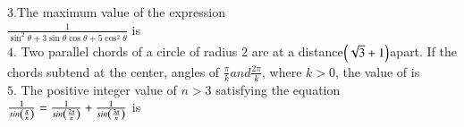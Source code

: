 \documentclass[journal,12pt,twocolumn]{IEEEtran}
\theoremstyle{remark}
\begin{document}
$3$.The maximum value of the expression
\\$\frac{1}{\sin^2\theta+3\sin\theta \cos\theta+5\cos^2\theta}$ is  \hfill{}
\\


$4$. Two parallel chords of a circle of radius $2$ are at a distance$\left(\sqrt{3}+1\right) $\space apart. If the chords subtend at the center, angles of $\frac{\pi}{k} and \frac{2\pi}{k}$, where $k>0$, the value of  is \hfill{}
\\

$5$. The positive integer value of $n>3$ satisfying the equation $\frac{1}{sin\left(\frac{\pi}{n}\right)}=\frac{1}{sin\left(\frac{2\pi}{n}\right)}+\frac{1}{sin\left(\frac{3\pi}{n}\right)}$ is\hfill{}
\end{document}
